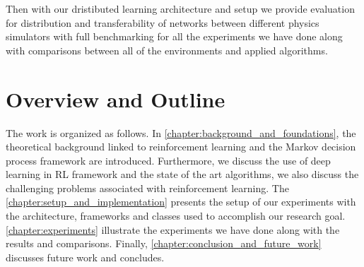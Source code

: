 Then with our dristibuted learning architecture and setup we provide evaluation for distribution and transferability of networks between different physics simulators with full benchmarking for all the experiments we have done along with comparisons between all of the environments and applied algorithms.

\section{Overview and Outline}
The work is organized as follows. In \autoref{chapter:background_and_foundations}, the theoretical background linked to reinforcement learning and the Markov decision process framework are introduced. Furthermore, we discuss the use of deep learning in RL framework and the state of the art algorithms, we also discuss the challenging problems associated with reinforcement learning.  The \autoref{chapter:setup_and_implementation} presents the setup of our experiments with the architecture, frameworks and classes used to accomplish our research goal. \autoref{chapter:experiments} illustrate the experiments we have done along with the results and comparisons. Finally, \autoref{chapter:conclusion_and_future_work} discusses future work and concludes.